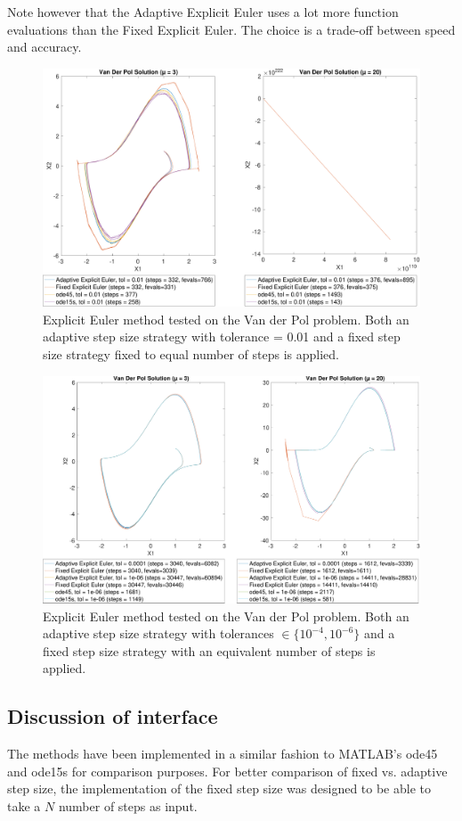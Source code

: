 Note however that the Adaptive Explicit Euler uses a lot more function evaluations than the Fixed Explicit Euler. The choice is a trade-off between speed and accuracy.

\begin{figure}
    \centering
    \includegraphics[width=\textwidth]{plots/2_4main_02.pdf}
    \caption{Explicit Euler method tested on the Van der Pol problem. Both an adaptive step size strategy with tolerance = 0.01 and a fixed step size strategy fixed to equal number of steps is applied.}
    \label{fig:2_4a}
\end{figure}

\begin{figure}
    \centering
    \includegraphics[width=\textwidth]{plots/2_4main_04_06.pdf}
    \caption{Explicit Euler method tested on the Van der Pol problem. Both an adaptive step size strategy with tolerances $\in \{10^{-4}, 10^{-6}\}$ and a fixed step size strategy with an equivalent number of steps is applied.}
    \label{fig:2_4b}
\end{figure}

\subsection{Discussion of interface}
The methods have been implemented in a similar fashion to MATLAB's ode45 and ode15s for comparison purposes. For better comparison of fixed vs. adaptive step size, the implementation of the fixed step size was designed to be able to take a $N$ number of steps as input.